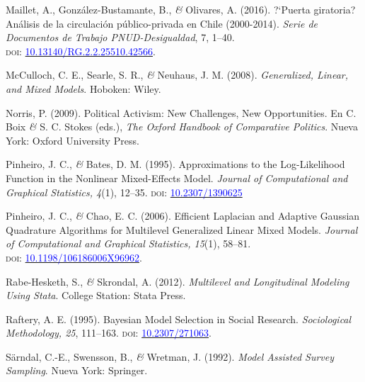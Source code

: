 \documentclass[a4paper]{tufte-handout}
\begin{document}
\begin{list}{}
\item{\small Maillet, A., González-Bustamante, B., {\itshape \&} Olivares, A. (2016). ?`Puerta giratoria? Análisis de la circulación público-privada en Chile (2000-2014). {\itshape Serie de Documentos de Trabajo PNUD-Desigualdad}, 7,  1--40. \\ {\scshape doi:} \href{https://doi.org/10.13140/RG.2.2.25510.42566}{\textcolor{blue}{10.13140/RG.2.2.25510.42566}}.}

\item{\small McCulloch, C. E., Searle, S. R., {\itshape \&} Neuhaus, J. M. (2008). {\itshape Generalized, Linear, and Mixed Models}. Hoboken: Wiley.}

\item{\small Norris, P. (2009). Political Activism: New Challenges, New Opportunities. En C. Boix {\itshape \&} S. C. Stokes (eds.), {\itshape The Oxford Handbook of Comparative Politics}. Nueva York: Oxford University Press.}

\item{\small Pinheiro, J. C., {\itshape \&} Bates, D. M. (1995). Approximations to the Log-Likelihood Function in the Nonlinear Mixed-Effects Model. {\itshape Journal of Computational and Graphical Statistics, 4}(1), 12--35. {\scshape doi:} \href{http://doi.org/10.2307/1390625}{\textcolor{blue}{10.2307/1390625}}}

\item{\small Pinheiro, J. C., {\itshape \&} Chao, E. C. (2006). Efficient Laplacian and Adaptive Gaussian Quadrature Algorithms for Multilevel Generalized Linear Mixed Models. {\itshape Journal of Computational and Graphical Statistics, 15}(1), 58--81. \\ {\scshape doi:} \href{https://doi.org/10.1198/106186006X96962}{\textcolor{blue}{10.1198/106186006X96962}}.}

\item{\small Rabe-Hesketh, S., {\itshape \&} Skrondal, A. (2012). {\itshape Multilevel and Longitudinal Modeling Using Stata}. College Station: Stata Press.}

\item{\small Raftery, A. E. (1995). Bayesian Model Selection in Social Research. {\itshape Sociological Methodology, 25}, 111--163. {\scshape doi:} \href{http://doi.org/10.2307/271063}{\textcolor{blue}{10.2307/271063}}.}

\item{\small Särndal, C.-E., Swensson, B., {\itshape \&} Wretman, J. (1992). {\itshape Model Assisted Survey Sampling}. Nueva York: Springer.}


\end{list}
\end{document}
